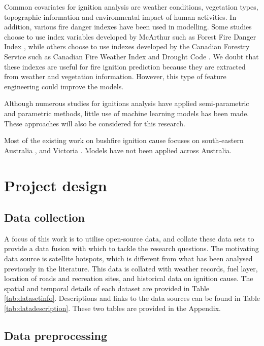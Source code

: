 \documentclass[11pt,a4paper,]{article}
\begin{document}
Common covariates for ignition analysis are weather conditions, vegetation types, topographic information and environmental impact of human activities. In addition, various fire danger indexes have been used in modelling. Some studies choose to use index variables developed by McArthur such as Forest Fire Danger Index \autocite{clarke2019developing,read2018lightning}, while others choose to use indexes developed by the Canadian Forestry Service such as Canadian Fire Weather Index and Drought Code \autocite{plucinski2014predicting}. We doubt that these indexes are useful for fire ignition prediction because they are extracted from weather and vegetation information. However, this type of feature engineering could improve the models.

Although numerous studies for ignitions analysis have applied semi-parametric and parametric methods, little use of machine learning models has been made. These approaches will also be considered for this research.

Most of the existing work on bushfire ignition cause focuses on south-eastern Australia \autocite{clarke2019developing}, and Victoria \autocite{read2018lightning}. Models have not been applied across Australia.

\hypertarget{project-design}{%
\section{Project design}\label{project-design}}

\hypertarget{data-collection}{%
\subsection{Data collection}\label{data-collection}}

A focus of this work is to utilise open-source data, and collate these data sets to provide a data fusion with which to tackle the research questions. The motivating data source is satellite hotspots, which is different from what has been analysed previously in the literature. This data is collated with weather records, fuel layer, location of roads and recreation sites, and historical data on ignition cause. The spatial and temporal details of each dataset are provided in Table \ref{tab:datasetinfo}. Descriptions and links to the data sources can be found in Table \ref{tab:datadescription}. These two tables are provided in the Appendix.

\hypertarget{data-preprocessing}{%
\subsection{Data preprocessing}\label{data-preprocessing}}
\end{document}
